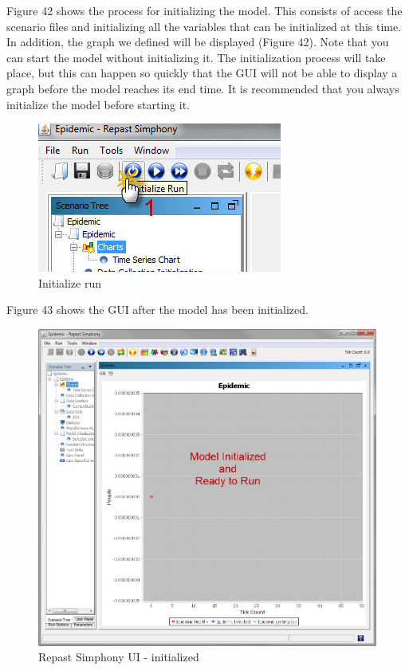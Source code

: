 \documentclass[11pt]{amsart}
\begin{document}
Figure 42 shows the process for initializing the model. This consists of access the scenario files and initializing all the variables that can be initialized at this time. In addition, the graph we defined will be displayed (Figure 42). Note that you can start the model without initializing it. The initialization process will take place, but this can happen so quickly that the GUI will not be able to display a graph before the model reaches its end time. It is recommended that you always initialize the model before starting it.


\begin{figure}[ht]
\begin{center}
\vspace{.2in}
\centerline {
\includegraphics[totalheight=0.3\textheight]{images/040.jpg}
}
\caption{Initialize run}
\label{fig:040}
\end{center}
\end{figure}

Figure 43 shows the GUI after the model has been initialized.


\begin{figure}[ht]
\begin{center}
\vspace{.2in}
\centerline {
\includegraphics[totalheight=0.3\textheight]{images/041.jpg}
}
\caption{Repast Simphony UI - initialized}
\label{fig:041}
\end{center}
\end{figure}
\end{document}
